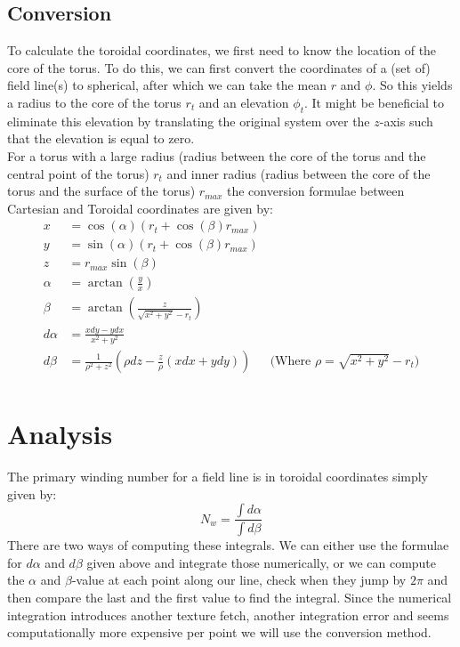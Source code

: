 \documentclass{article}
\begin{document}
\subsection{Conversion}
To calculate the toroidal coordinates, we first need to know the location of the core of the torus. To do this, we can first convert the coordinates of a (set of) field line(s) to spherical, after which we can take the mean $r$ and $\phi$. So this yields a radius to the core of the torus $r_t$ and an elevation $\phi_t$. It might be beneficial to eliminate this elevation by translating the original system over the $z$-axis such that the elevation is equal to zero.\\
For a torus with a large radius (radius between the core of the torus and the central point of the torus) $r_t$ and inner radius (radius between the core of the torus and the surface of the torus) $r_{max}$ the conversion formulae between Cartesian and Toroidal coordinates are given by:
\begin{align*}
x &= \cos(\alpha)(r_{t}+\cos(\beta)r_{max})\\
y &= \sin(\alpha)(r_{t}+\cos(\beta)r_{max})\\
z &= r_{max}\sin(\beta)\\
\alpha &= \arctan\left(\frac{y}{x}\right)\\
\beta &= \arctan\left(\frac{z}{\sqrt{x^2+y^2}-r_{t}}\right)\\
d\alpha &= \frac{xdy-ydx}{x^2+y^2}\\
d\beta &= \frac{1}{\rho^2+z^2}\left(\rho dz - \frac{z}{\rho}(xdx+ydy)\right) &\text{(Where $\rho = \sqrt{x^2+y^2}-r_{t}$)}\\
\end{align*}
\section{Analysis}
The primary winding number for a field line is in toroidal coordinates simply given by:
\[N_w = \frac{\int d\alpha}{\int d\beta}\]
There are two ways of computing these integrals. We can either use the formulae for $d\alpha$ and $d\beta$ given above and integrate those numerically, or we can compute the $\alpha$ and $\beta$-value at each point along our line, check when they jump by $2\pi$ and then compare the last and the first value to find the integral. Since the numerical integration introduces another texture fetch, another integration error and seems computationally more expensive per point we will use the conversion method.


\end{document}
